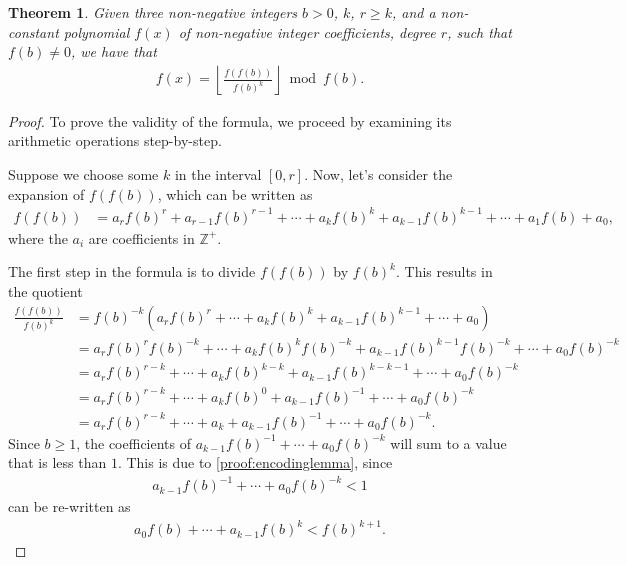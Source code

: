 \documentclass[10pt]{article}
\theoremstyle{plain}
\newtheorem{theorem}{Theorem}[section]
\newcommand{\floor}[1]{\left\lfloor #1 \right\rfloor}
\newcommand{\Z}{\mathbb{Z}}
\begin{document}
\begin{theorem} \label{theorem:encoding}
Given three non-negative integers $b > 0$, $k$, $r \geq k$, and a non-constant polynomial $f(x)$ of non-negative integer coefficients, degree $r$, such that $f(b) \not= 0$, we have that
\begin{align*}
[x^k]f(x) = \floor{\frac{f(f(b))}{f(b)^{k}}} \bmod{f(b)} .
\end{align*}
\end{theorem}
\begin{proof}
To prove the validity of the formula, we proceed by examining its arithmetic operations step-by-step.

Suppose we choose some $k$ in the interval $[0,r]$. Now, let's consider the expansion of $f(f(b))$, which can be written as
\begin{align*}
f(f(b)) &= a_r f(b)^r + a_{r-1} f(b)^{r-1} + \cdots + a_{k} f(b)^{k} + a_{k-1} f(b)^{k-1} + \cdots + a_1 f(b) + a_0 ,
\end{align*}
where the $a_i$ are coefficients in $\Z^+$.

The first step in the formula is to divide $f(f(b))$ by $f(b)^k$. This results in the quotient
\begin{align*}
\frac{f(f(b))}{f(b)^k} &= f(b)^{-k} (a_r f(b)^r  + \cdots + a_k f(b)^k + a_{k-1} f(b)^{k-1} + \cdots + a_0) \\
&= a_r f(b)^r f(b)^{-k} + \cdots + a_{k} f(b)^{k} f(b)^{-k} + a_{k-1} f(b)^{k-1} f(b)^{-k} + \cdots + a_0 f(b)^{-k} \\
&= a_r f(b)^{r-k} + \cdots + a_{k} f(b)^{k-k} + a_{k-1} f(b)^{k-k-1} + \cdots + a_0 f(b)^{-k}  \\
&= a_r f(b)^{r-k} + \cdots + a_{k} f(b)^{0} + a_{k-1} f(b)^{-1} + \cdots + a_0 f(b)^{-k}  \\
&= a_r f(b)^{r-k} + \cdots + a_{k} + a_{k-1} f(b)^{-1} + \cdots + a_0 f(b)^{-k} .
\end{align*}
Since $b \geq 1$, the coefficients of $a_{k-1} f(b)^{-1} + \cdots + a_0 f(b)^{-k}$ will sum to a value that is less than $1$. This is due to \cref{proof:encodinglemma}, since
\begin{align*}
a_{k-1} f(b)^{-1} + \cdots + a_0 f(b)^{-k} < 1 
\end{align*}
can be re-written as
\begin{align*}
a_0 f(b) + \cdots + a_{k-1} f(b)^k < f(b)^{k+1} .    
\end{align*}


\end{proof}
\end{document}
